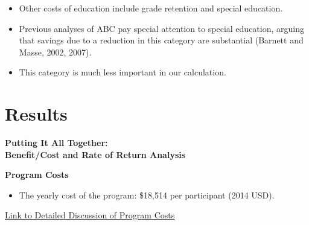 \documentclass[static]{JJH-Beamer}
\begin{document}
\begin{itemize}
\item Other costs of education include grade retention and special education.
\item Previous analyses of ABC pay special attention to special education, arguing that savings due to a reduction in this category are substantial (Barnett and Masse, 2002, 2007).
\item This category is much less important in our calculation.
\end{itemize}

\section{Results}

\begin{frame}

\begin{block}{}
\begin{center}
\textbf{Putting It All Together:\\ Benefit/Cost and Rate of Return Analysis}
\end{center}
\end{block}

\end{frame}

\begin{frame}

\begin{center}
\textbf{Program Costs}
\end{center}

\begin{itemize}
\item The yearly cost of the program: \$18,514 per participant (2014 USD).
\end{itemize}

\end{frame}

\begin{frame}
\hypertarget{ret:jorge}{}

\begin{center}
\hyperlink{jorge}{\underline{Link to Detailed Discussion of Program Costs}}
\end{center}

\end{frame}
\end{document}
